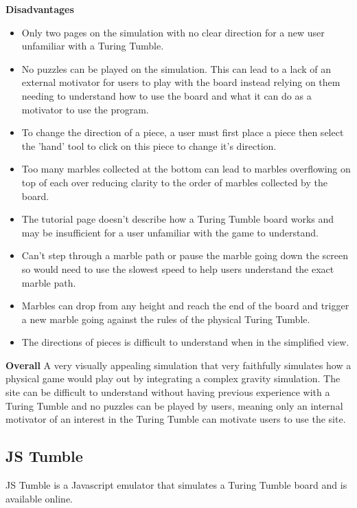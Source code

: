 \documentclass{l4proj}
\begin{document}
\textbf{Disadvantages}
\begin{itemize}
    \item Only two pages on the simulation with no clear direction for a new user unfamiliar with a Turing Tumble.
    \item No puzzles can be played on the simulation. This can lead to a lack of an external motivator for users to play with the board instead relying on them needing to understand how to use the board and what it can do as a motivator to use the program.
    \item To change the direction of a piece, a user must first place a piece then select the 'hand' tool to click on this piece to change it's direction. 
    \item Too many marbles collected at the bottom can lead to marbles overflowing on top of each over reducing clarity to the order of marbles collected by the board.
    \item The tutorial page doesn't describe how a Turing Tumble board works and may be insufficient for a user unfamiliar with the game to understand.
    \item Can't step through a marble path or pause the marble going down the screen so would need to use the slowest speed to help users understand the exact marble path.
    \item Marbles can drop from any height and reach the end of the board and trigger a new marble going against the rules of the physical Turing Tumble.
    \item The directions of pieces is difficult to understand when in the simplified view.
\end{itemize}

\textbf{Overall}
A very visually appealing simulation that very faithfully simulates how a physical game would play out by integrating a complex gravity simulation. The site can be difficult to understand without having previous experience with a Turing Tumble and no puzzles can be played by users, meaning only an internal motivator of an interest in the Turing Tumble can motivate users to use the site.

\subsection{JS Tumble}
JS Tumble is a Javascript emulator that simulates a Turing Tumble board and is available online.
\end{document}
